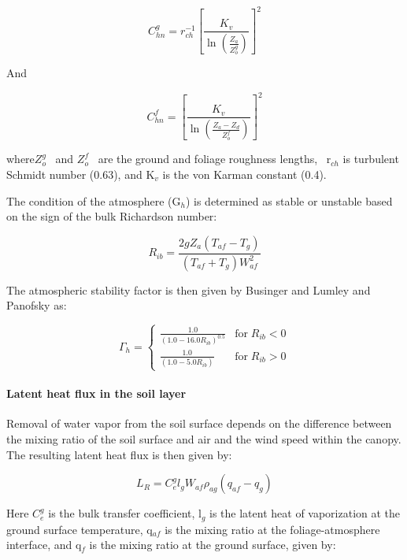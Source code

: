 \begin{equation}
C_{hn}^g = r_{ch}^{ - 1}{\left[ {\frac{{{K_v}}}{{\ln \left( \frac{Z_a}{Z_o^g} \right)}}} \right]^2}
\end{equation}

And

\begin{equation}
C_{hn}^f = {\left[ {\frac{{K_v}}{{\ln \left( \frac{{Z_a} - {Z_d}}{Z_o^f} \right)}}} \right]^2}
\end{equation}

where\(Z_o^g\) ~and \(Z_o^f\) ~are the ground and foliage roughness lengths,~ r\(_{ch}\) is turbulent Schmidt number (0.63), and K\(_{v}\) is the von Karman constant (0.4).

The condition of the atmosphere (G\(_{h}\)) is determined as stable or unstable based on the sign of the bulk Richardson number:

\begin{equation}
{R_{ib}} = \frac{{2g{Z_a}\left( {{T_{af}} - {T_g}} \right)}}{{\left( {{T_{af}} + {T_g}} \right)W_{af}^2}}
\end{equation}

The atmospheric stability factor is then given by Businger and Lumley and Panofsky as:

\begin{equation}
\Gamma_h = \left\{ 
    \begin{array}{cl}
      \frac{1.0}{\left( 1.0 - 16.0 R_{ib} \right)^{0.5}} & \text{for} \; R_{ib} < 0 \\
      \frac{1.0}{\left( 1.0 - 5.0  R_{ib} \right)      } & \text{for} \; R_{ib} > 0
    \end{array}
  \right.
\end{equation}

\paragraph{Latent heat flux in the soil layer}\label{latent-heat-flux-in-the-soil-layer}

Removal of water vapor from the soil surface depends on the difference between the mixing ratio of the soil surface and air and the wind speed within the canopy. The resulting latent heat flux is then given by:

\begin{equation}
{L_R} = C_e^g{l_g}{W_{af}}{\rho_{ag}}\left( {{q_{af}} - {q_g}} \right)
\end{equation}

Here \(C_e^g\) is the bulk transfer coefficient, l\(_{g}\) is the latent heat of vaporization at the ground surface temperature, q\(_{af}\) is the mixing ratio at the foliage-atmosphere interface, and q\(_{f}\) is the mixing ratio at the ground surface, given by:


